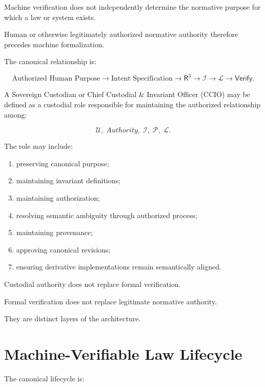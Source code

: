 \documentclass[11pt]{article}
\newcommand{\Rthree}{\ensuremath{\mathsf{R}^{3}}}
\newcommand{\Purpose}{\mathcal{U}}
\newcommand{\Inv}{\mathcal{I}}
\newcommand{\Law}{\mathcal{L}}
\newcommand{\Prov}{\mathcal{P}}
\newcommand{\Verify}{\mathsf{Verify}}
\newcommand{\CCIO}{\ensuremath{\mathrm{CCIO}}}
\begin{document}
Machine verification does not independently determine the
normative purpose for which a law or system exists.

Human or otherwise legitimately authorized normative authority
therefore precedes machine formalization.

The canonical relationship is:

\[
\boxed{
\text{Authorized Human Purpose}
\rightarrow
\text{Intent Specification}
\rightarrow
\Rthree{}
\rightarrow
\Inv
\rightarrow
\Law
\rightarrow
\Verify.
}
\]

A Sovereign Custodian or Chief Custodial \& Invariant Officer
(\CCIO{}) may be defined as a custodial role responsible for
maintaining the authorized relationship among:

\[
\Purpose,\;
Authority,\;
\Inv,\;
\Prov,\;
\Law.
\]

The role may include:

\begin{enumerate}
    \item preserving canonical purpose;
    \item maintaining invariant definitions;
    \item maintaining authorization;
    \item resolving semantic ambiguity through authorized process;
    \item maintaining provenance;
    \item approving canonical revisions;
    \item ensuring derivative implementations remain semantically
          aligned.
\end{enumerate}

Custodial authority does not replace formal verification.

Formal verification does not replace legitimate normative
authority.

They are distinct layers of the architecture.

\section{Machine-Verifiable Law Lifecycle}

The canonical lifecycle is:
\end{document}
